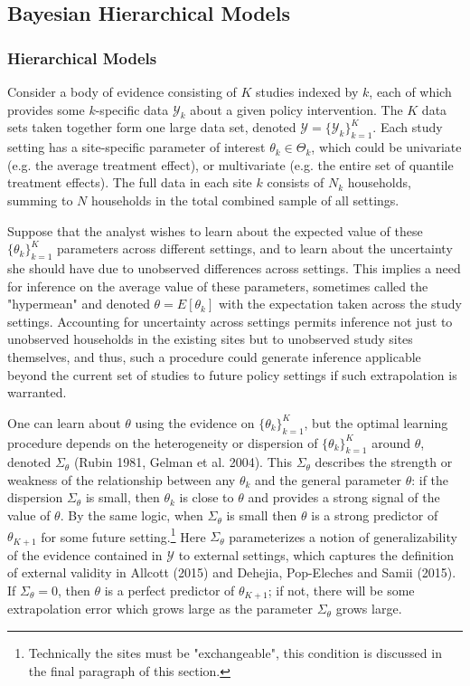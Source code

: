 \documentclass[AER]{AEA}
\begin{document}
\subsection{Bayesian Hierarchical Models}

\subsubsection{Hierarchical Models}

Consider a body of evidence consisting of $K$ studies indexed by $k$, each of which provides some $k$-specific data $\mathcal{Y}_k$ about a given policy intervention. The $K$ data sets taken together form one large data set, denoted $\mathcal{Y} = \{    \mathcal{Y}_k \}_{k=1}^K$. Each study setting has a site-specific parameter of interest $\theta_k \in \Theta_k$, which could be univariate (e.g. the average treatment effect), or multivariate (e.g. the entire set of quantile treatment effects). The full data in each site $k$ consists of $N_k$ households, summing to $N$ households in the total combined sample of all settings.

Suppose that the analyst wishes to learn about the expected value of these  $\{\theta_k\}^K_{k=1}$ parameters across different settings, and to learn about the uncertainty she should have due to unobserved differences across settings. This implies a need for inference on the average value of these parameters, sometimes called the "hypermean" and denoted $\theta = E[\theta_k]$ with the expectation taken across the study settings. Accounting for uncertainty across settings permits inference not just to unobserved households in the existing sites but to unobserved study sites themselves, and thus, such a procedure could generate inference applicable beyond the current set of studies to future policy settings if such extrapolation is warranted.  

 One can learn about $\theta$ using the evidence on $ \{ \theta_k \}_{k=1}^K$, but the optimal learning procedure depends on the heterogeneity or dispersion of $ \{ \theta_k \}_{k=1}^K$ around $\theta$, denoted $\Sigma_{\theta}$ (Rubin 1981, Gelman et al. 2004). This $\Sigma_{\theta}$ describes the strength or weakness of the relationship between any $\theta_k$ and the general parameter $\theta$: if the dispersion $\Sigma_{\theta}$  is small, then $\theta_k$ is close to $\theta$ and provides a strong signal of the value of $\theta$. By the same logic, when $\Sigma_{\theta}$ is small then $\theta$ is a strong predictor of $\theta_{K+1}$ for some future setting.\footnote{Technically the sites must be "exchangeable", this condition is discussed in the final paragraph of this section.} Here $\Sigma_{\theta}$ parameterizes a notion of generalizability of the evidence contained in $\mathcal{Y}$ to external settings, which captures the definition of external validity in Allcott (2015) and Dehejia, Pop-Eleches and Samii (2015). If $\Sigma_{\theta} = 0$, then $\theta$ is a perfect predictor of $\theta_{K+1}$; if not, there will be some extrapolation error which grows large as the parameter $\Sigma_{\theta}$ grows large.
\end{document}
